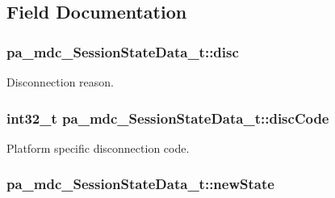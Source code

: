 \subsection{Field Documentation}
\subsubsection[{\texorpdfstring{disc}{disc}}]{ pa\+\_\+mdc\+\_\+\+Session\+State\+Data\+\_\+t\+::disc}\hypertarget{structpa__mdc___session_state_data__t_a6d51164c8245866a47dbd2ba67c8aa81}{}\label{structpa__mdc___session_state_data__t_a6d51164c8245866a47dbd2ba67c8aa81}


Disconnection reason. 

\subsubsection[{\texorpdfstring{disc\+Code}{discCode}}]{\setlength{\rightskip}{0pt plus 5cm}int32\+\_\+t pa\+\_\+mdc\+\_\+\+Session\+State\+Data\+\_\+t\+::disc\+Code}\hypertarget{structpa__mdc___session_state_data__t_a4eb5683ae6d4efc619bba3a6b8a0be37}{}\label{structpa__mdc___session_state_data__t_a4eb5683ae6d4efc619bba3a6b8a0be37}


Platform specific disconnection code. 

\subsubsection[{\texorpdfstring{new\+State}{newState}}]{ pa\+\_\+mdc\+\_\+\+Session\+State\+Data\+\_\+t\+::new\+State}\hypertarget{structpa__mdc___session_state_data__t_ade21f2da64f30583e06c528df39be9a9}{}\label{structpa__mdc___session_state_data__t_ade21f2da64f30583e06c528df39be9a9}


